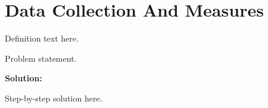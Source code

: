 \section{Data Collection And Measures}


\begin{definition}[Term]
Definition text here.
\end{definition}

\begin{example}
Problem statement.

\textbf{Solution:}

Step-by-step solution here.
\end{example}

